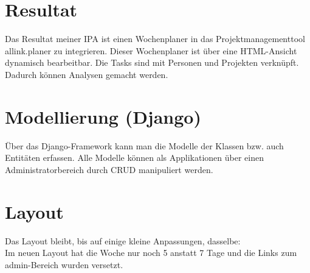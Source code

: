 \section{Resultat}
Das Resultat meiner IPA ist einen Wochenplaner in das Projektmanagementtool allink.planer zu integrieren.
Dieser Wochenplaner ist über eine HTML-Ansicht dynamisch bearbeitbar. Die Tasks sind mit Personen und Projekten verknüpft. Dadurch können Analysen gemacht werden.
\section{Modellierung (Django) }
Über das Django-Framework kann man die Modelle der Klassen bzw. auch Entitäten erfassen.
Alle Modelle können als Applikationen über einen Administratorbereich durch CRUD manipuliert werden.
\section{Layout}
Das Layout bleibt, bis auf einige kleine Anpassungen, dasselbe:\\
Im neuen Layout hat die Woche nur noch 5 anstatt 7 Tage und die Links zum admin-Bereich wurden versetzt.
